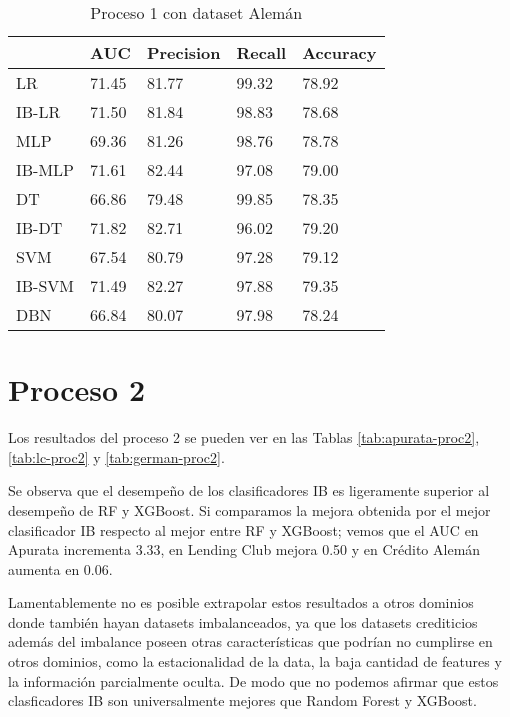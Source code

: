 \begin{table}[]
\centering
\caption{Proceso 1 con dataset Alemán}
\label{tab:german-proc1}
\begin{tabularx}{0.75\textwidth}{|l|Y Y Y Y|}
                \hline
                & AUC       & Precision & Recall    & Accuracy  \\
                \hline
LR              & 71.45     & 81.77     & 99.32     & 78.92     \\
IB-LR           & 71.50     & 81.84     & 98.83     & 78.68     \\
                \hline
MLP             & 69.36     & 81.26     & 98.76     & 78.78     \\
IB-MLP          & 71.61     & 82.44     & 97.08     & 79.00     \\
                \hline
DT              & 66.86     & 79.48     & 99.85     & 78.35     \\
IB-DT           & 71.82     & 82.71     & 96.02     & 79.20     \\
                \hline
SVM             & 67.54     & 80.79     & 97.28     & 79.12     \\
IB-SVM          & 71.49     & 82.27     & 97.88     & 79.35     \\
                \hline
DBN             & 66.84     & 80.07     & 97.98     & 78.24     \\
                \hline
\end{tabularx}
\end{table}


\section{Proceso 2} %

Los resultados del proceso 2 se pueden ver en las Tablas \ref{tab:apurata-proc2}, \ref{tab:lc-proc2} y \ref{tab:german-proc2}.

Se observa que el desempeño de los clasificadores IB es ligeramente superior al desempeño de \ac{RF} y \ac{XGBoost}. Si comparamos la mejora obtenida por el mejor clasificador IB respecto al mejor entre RF y XGBoost; vemos que el AUC en Apurata incrementa 3.33, en Lending Club mejora 0.50 y en Crédito Alemán aumenta en 0.06.

Lamentablemente no es posible extrapolar estos resultados a otros dominios donde también hayan datasets imbalanceados, ya que los datasets crediticios además del imbalance poseen otras características que podrían no cumplirse en otros dominios, como la estacionalidad de la data, la baja cantidad de features y la información parcialmente oculta. De modo que no podemos afirmar que estos clasficadores IB son universalmente mejores que Random Forest y XGBoost.

